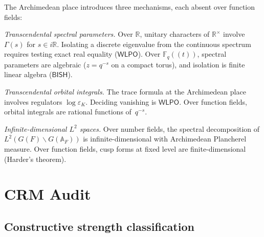 \documentclass[11pt]{article}
\theoremstyle{plain}
\theoremstyle{definition}
\theoremstyle{remark}
\newcommand{\R}{\mathbb{R}}
\newcommand{\Fq}{\mathbb{F}_q}
\newcommand{\A}{\mathbb{A}}
\newcommand{\BISH}{\mathsf{BISH}}
\newcommand{\WLPO}{\mathsf{WLPO}}
\begin{document}
The Archimedean place introduces three mechanisms, each absent over function
fields:

\emph{Transcendental spectral parameters.} Over $\R$, unitary characters of
$\R^\times$ involve $\Gamma(s)$ for $s \in i\R$. Isolating a discrete
eigenvalue from the continuous spectrum requires testing exact real equality
($\WLPO$). Over $\Fq((t))$, spectral parameters are algebraic
($z = q^{-s}$ on a compact torus), and isolation is finite linear algebra
($\BISH$).

\emph{Transcendental orbital integrals.} The trace formula at the Archimedean
place involves regulators $\log \varepsilon_K$. Deciding vanishing is $\WLPO$.
Over function fields, orbital integrals are rational functions of~$q^{-s}$.

\emph{Infinite-dimensional $L^2$ spaces.} Over number fields, the spectral
decomposition of $L^2(G(F) \backslash G(\A_F))$ is infinite-dimensional with
Archimedean Plancherel measure. Over function fields, cusp forms at fixed
level are finite-dimensional (Harder's theorem).

\section{CRM Audit}\label{sec:crm}

\subsection{Constructive strength classification}
\end{document}
